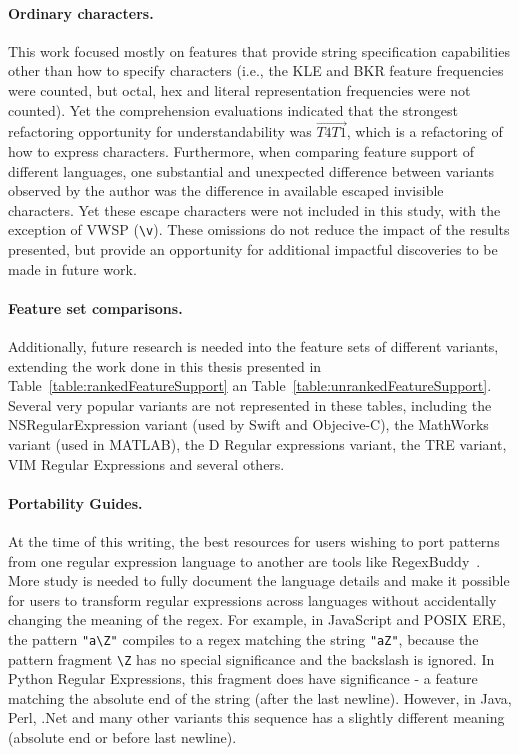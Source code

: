 \paragraph{Ordinary characters.}  This work focused mostly on features that provide string specification capabilities other than how to specify characters (i.e., the KLE and BKR feature frequencies were counted, but octal, hex and literal representation frequencies were not counted).  Yet the comprehension evaluations indicated that the strongest refactoring opportunity for understandability was $\overrightarrow{T4 T1}$, which is a refactoring of how to express characters.  Furthermore, when comparing feature support of different languages, one substantial and unexpected difference between variants observed by the author was the difference in available escaped invisible characters.  Yet these escape characters were not included in this study, with the exception of VWSP (\verb!\v!).  These omissions do not reduce the impact of the results presented, but provide an opportunity for additional impactful discoveries to be made in future work.

\paragraph{Feature set comparisons.} Additionally, future research is needed into the feature sets of different variants, extending the work done in this thesis presented in Table~\ref{table:rankedFeatureSupport} an Table~\ref{table:unrankedFeatureSupport}.  Several very popular variants are not represented in these tables, including the NSRegularExpression variant (used by Swift and Objecive-C), the MathWorks variant (used in MATLAB), the D Regular expressions variant, the TRE variant, VIM Regular Expressions and several others.

\paragraph{Portability Guides.} At the time of this writing, the best resources for users wishing to port patterns from one regular expression language to another are tools like RegexBuddy~\citep{RegexBuddy}.  More study is needed to fully document the language details and make it possible for users to transform regular expressions across languages without accidentally changing the meaning of the regex.  For example, in JavaScript and POSIX ERE, the pattern \verb!"a\Z"! compiles to a regex matching the string \verb!"aZ"!, because the pattern fragment \verb!\Z! has no special significance and the backslash is ignored.  In Python Regular Expressions, this fragment does have significance - a feature matching the absolute end of the string (after the last newline).  However, in Java, Perl, .Net and many other variants this sequence has a slightly different meaning (absolute end or before last newline).

